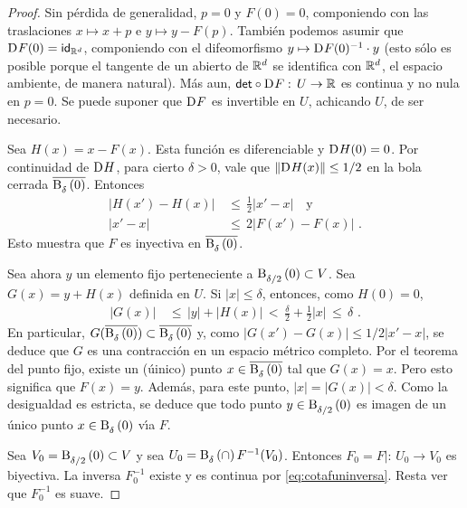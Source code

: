 \begin{proof}
	Sin p\'{e}rdida de generalidad, $p=0$ y $F(0)=0$, componiendo con
	las traslaciones $x\mapsto x+p$ e $y\mapsto y-F(p)$. Tambi\'{e}n
	podemos asumir que $\jacobiana{F}(0)=\id[\bb{R}^{d}]$, componiendo
	con el difeomorfismo $y\mapsto \jacobiana{F}(0)^{-1}\cdot y$
	(esto s\'{o}lo es posible porque el tangente de un abierto de
	$\bb{R}^{d}$ se identifica con $\bb{R}^{d}$, el espacio ambiente,
	de manera natural). M\'{a}s aun,
	$\det\circ\jacobiana{F}:\,U\rightarrow\bb{R}$ es continua y no
	nula en $p=0$. Se puede suponer que $\jacobiana{F}$ es invertible
	en $U$, achicando $U$, de ser necesario.

	Sea $H(x)=x-F(x)$. Esta funci\'{o}n es diferenciable y
	$\jacobiana{H}(0)=0$. Por continuidad de $\jacobiana{H}$, para cierto
	$\delta>0$, vale que $\|\jacobiana{H}(x)\|\leq 1/2$ en la bola
	cerrada $\clos{\bola{\delta}{0}}$. Entonces
	\begin{equation}
		\label{eq:cotafuninversa}
		\begin{aligned}
		|H(x')-H(x)| & \,\leq\,\frac{1}{2}|x'-x|\quad\text{y} \\
		|x'-x| & \,\leq\,2|F(x')-F(x)|\text{ .}
		\end{aligned}
	\end{equation}
	Esto muestra que $F$ es inyectiva en $\clos{\bola{\delta}{0}}$.

	Sea ahora $y$ un elemento fijo perteneciente a
	$\bola{\delta/2}{0}\subset V$. Sea $G(x)=y+H(x)$ definida en $U$.
	Si $|x|\leq\delta$, entonces, como $H(0)=0$,
	\begin{align*}
		|G(x)| & \,\leq\,|y|+|H(x)|\,<\,\frac{\delta}{2}+\frac{1}{2}|x|
			\,\leq\,\delta
		\text{ .}
	\end{align*}
	En particular,
	$G(\clos{\bola{\delta}{0}})\subset\clos{\bola{\delta}{0}}$ y,
	como $|G(x')-G(x)|\leq 1/2|x'-x|$, se deduce que $G$ es una
	contracci\'{o}n en un espacio m\'{e}trico completo. Por el teorema
	del punto fijo, existe un (\'{u}inico) punto
	$x\in\clos{\bola{\delta}{0}}$ tal que $G(x)=x$. Pero esto significa
	que $F(x)=y$. Adem\'{a}s, para este punto, $|x|=|G(x)|<\delta$.
	Como la desigualdad es estricta, se deduce que todo punto
	$y\in\bola{\delta/2}{0}$ es imagen de un \'{u}nico punto
	$x\in\bola{\delta}{0}$ v\'{\i}a $F$.

	Sea $V_{0}=\bola{\delta/2}{0}\subset V$ y sea
	$U_{0}=\bola{\delta}\cap F^{-1}(V_{0})$. Entonces
	$F_{0}=F|:\,U_{0}\rightarrow V_{0}$ es biyectiva. La inversa
	$F_{0}^{-1}$ existe y es continua por \eqref{eq:cotafuninversa}.
	Resta ver que $F_{0}^{-1}$ es suave.


\end{proof}

